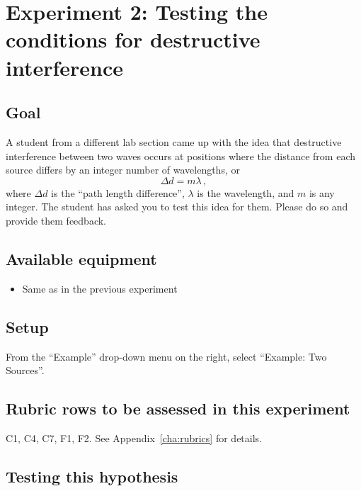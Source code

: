 \section{Experiment 2: Testing the conditions for destructive interference}

\subsection{Goal}

A student from a different lab section came up with the idea that destructive interference between two waves occurs at positions where the distance from each source differs by an integer number of wavelengths, or
\begin{equation}
 \Delta d = m\lambda \,,
\end{equation}
where $\Delta d$ is the ``path length difference'', $\lambda$ is the wavelength, and $m$ is any integer. The student has asked you to test this idea for them. Please do so and provide them feedback.

\subsection{Available equipment}

\begin{itemize}
	\item Same as in the previous experiment
\end{itemize}

\subsection{Setup}

From the ``Example'' drop-down menu on the right, select ``Example: Two Sources''.

\subsection{Rubric rows to be assessed in this experiment}

C1, C4, C7, F1, F2. See Appendix~\ref{cha:rubrics} for details.

\subsection{Testing this hypothesis}

